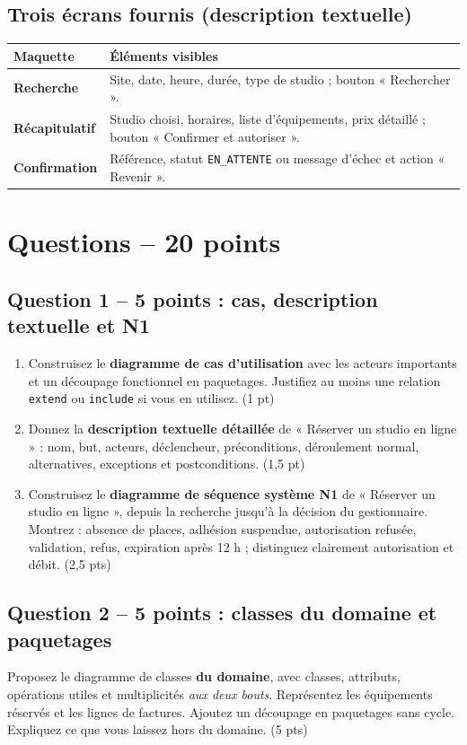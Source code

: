 \documentclass[10pt,a4paper]{article}
\begin{document}
\subsection{Trois écrans fournis (description textuelle)}
\begin{tabularx}{\linewidth}{@{}p{35mm}X@{}}
\toprule
Maquette & Éléments visibles \\
\midrule
\textbf{Recherche} & Site, date, heure, durée, type de studio ; bouton « Rechercher ». \\
\textbf{Récapitulatif} & Studio choisi, horaires, liste d'équipements, prix détaillé ; bouton « Confirmer et autoriser ». \\
\textbf{Confirmation} & Référence, statut \texttt{EN\_ATTENTE} ou message d'échec et action « Revenir ». \\
\bottomrule
\end{tabularx}
\newpage
\section{Questions -- 20 points}
\subsection*{Question 1 -- 5 points : cas, description textuelle et N1}
\begin{enumerate}[label=\alph*)]
\item Construisez le \textbf{diagramme de cas d'utilisation} avec les acteurs importants et un découpage fonctionnel en paquetages. Justifiez au moins une relation \texttt{extend} ou \texttt{include} si vous en utilisez. (1 pt)
\item Donnez la \textbf{description textuelle détaillée} de « Réserver un studio en ligne » : nom, but, acteurs, déclencheur, préconditions, déroulement normal, alternatives, exceptions et postconditions. (1,5 pt)
\item Construisez le \textbf{diagramme de séquence système N1} de « Réserver un studio en ligne », depuis la recherche jusqu'à la décision du gestionnaire. Montrez : absence de places, adhésion suspendue, autorisation refusée, validation, refus, expiration après 12 h ; distinguez clairement autorisation et débit. (2,5 pts)
\end{enumerate}
\subsection*{Question 2 -- 5 points : classes du domaine et paquetages}
Proposez le diagramme de classes \textbf{du domaine}, avec classes, attributs, opérations utiles et multiplicités \emph{aux deux bouts}. Représentez les équipements réservés et les lignes de factures. Ajoutez un découpage en paquetages sans cycle. Expliquez ce que vous laissez hors du domaine. (5 pts)
\end{document}
